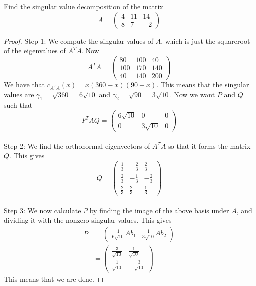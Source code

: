 \documentclass[a4paper]{article}
\begin{document}
\begin{eg}{}{} Find the singular value decomposition of the matrix $$A=\begin{pmatrix}
4 & 11 & 14\\
8 & 7 & -2
\end{pmatrix}$$ \tcbline
\begin{proof}
Step 1: We compute the singular values of $A$, which is just the squareroot of the eigenvalues of $A^TA$. Now 
$$A^TA=\begin{pmatrix}
80 & 100 & 40\\
100 & 170 & 140\\
40 & 140 & 200
\end{pmatrix}$$
We have that $c_{A^TA}(x)=x(360-x)(90-x)$. This means that the singular values are $\gamma_1=\sqrt{360}=6\sqrt{10}$ and $\gamma_2=\sqrt{90}=3\sqrt{10}$. Now we want $P$ and $Q$ such that $$P^TAQ=\begin{pmatrix}
6\sqrt{10} & 0 & 0\\
0 & 3\sqrt{10} & 0
\end{pmatrix}$$~\\
Step 2: We find the orthonormal eigenvectors of $A^TA$ so that it forms the matrix $Q$. This gives $$Q=\begin{pmatrix}
\frac{1}{3} & -\frac{2}{3} & \frac{2}{3}\\
\frac{2}{3} & -\frac{1}{3} & -\frac{2}{3}\\
\frac{2}{3} & \frac{2}{3} & \frac{1}{3}
\end{pmatrix}$$~\\
Step 3: We now calculate $P$ by finding the image of the above basis under $A$, and dividing it with the nonzero singular values. This gives 
\begin{align*}
P&=\begin{pmatrix}
\frac{1}{6\sqrt{10}}Ab_1 & \frac{1}{3\sqrt{10}}Ab_2
\end{pmatrix}\\
&=\begin{pmatrix}
\frac{3}{\sqrt{10}} & \frac{1}{\sqrt{10}}\\
\frac{1}{\sqrt{10}} & -\frac{3}{\sqrt{10}}
\end{pmatrix}
\end{align*}
This means that we are done. 
\end{proof}
\end{eg}
\end{document}
